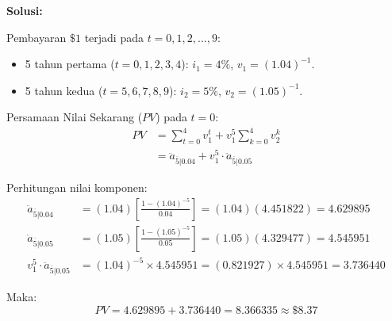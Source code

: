 \documentclass[11pt,a4paper]{article}
\begin{document}
\textbf{Solusi:}

Pembayaran $\$1$ terjadi pada $t = 0, 1, 2, \dots, 9$:
\begin{itemize}[leftmargin=1.5em, topsep=0pt, itemsep=0pt]
    \item 5 tahun pertama ($t = 0, 1, 2, 3, 4$): $i_1 = 4\%$, $v_1 = (1.04)^{-1}$.
    \item 5 tahun kedua ($t = 5, 6, 7, 8, 9$): $i_2 = 5\%$, $v_2 = (1.05)^{-1}$.
\end{itemize}

Persamaan Nilai Sekarang ($PV$) pada $t = 0$:
\begin{align*}
    PV &= \sum_{t=0}^4 v_1^t + v_1^5 \sum_{k=0}^4 v_2^k \\
    &= \ddot{a}_{\overline{5}|0.04} + v_1^5 \cdot \ddot{a}_{\overline{5}|0.05}
\end{align*}

Perhitungan nilai komponen:
\begin{align*}
    \ddot{a}_{\overline{5}|0.04} &= (1.04) \left[ \frac{1 - (1.04)^{-5}}{0.04} \right] = (1.04)(4.451822) = 4.629895 \\[0.3em]
    \ddot{a}_{\overline{5}|0.05} &= (1.05) \left[ \frac{1 - (1.05)^{-5}}{0.05} \right] = (1.05)(4.329477) = 4.545951 \\[0.3em]
    v_1^5 \cdot \ddot{a}_{\overline{5}|0.05} &= (1.04)^{-5} \times 4.545951 = (0.821927) \times 4.545951 = 3.736440
\end{align*}

Maka:
\begin{equation*}
    PV = 4.629895 + 3.736440 = \mathbf{8.366335 \approx \$8.37}
\end{equation*}
\end{document}
